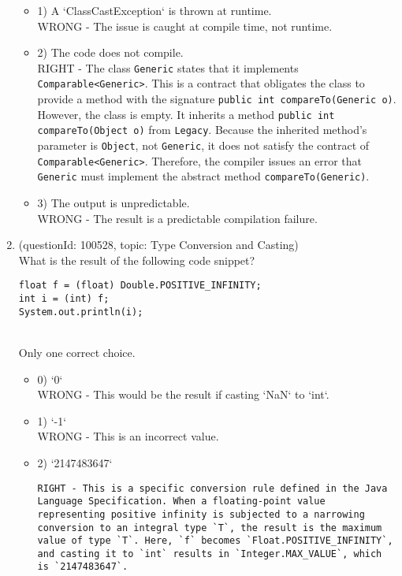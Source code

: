 \documentclass[12pt]{article}
\begin{document}
\begin{enumerate}[label=(\arabic*)]
\begin{itemize}
\item 1) A `ClassCastException` is thrown at runtime.
 \\ 
WRONG - The issue is caught at compile time, not runtime.

\item 2) The code does not compile.
 \\ 
RIGHT - The class \verb|Generic| states that it implements \verb|Comparable<Generic>|. This is a contract that obligates the class to provide a method with the signature \verb|public int compareTo(Generic o)|. However, the class is empty. It inherits a method \verb|public int compareTo(Object o)| from \verb|Legacy|. Because the inherited method's parameter is \verb|Object|, not \verb|Generic|, it does not satisfy the contract of \verb|Comparable<Generic>|. Therefore, the compiler issues an error that \verb|Generic| must implement the abstract method \verb|compareTo(Generic)|.

\item 3) The output is unpredictable.
 \\ 
WRONG - The result is a predictable compilation failure.

\end{itemize}
\item (questionId: 100528, topic: Type Conversion and Casting) \\ 
What is the result of the following code snippet?
\begin{verbatim}
float f = (float) Double.POSITIVE_INFINITY;
int i = (int) f;
System.out.println(i);
\end{verbatim}
\\ \noindent Only one correct choice. 
\begin{itemize}
\item 0) `0`
 \\ 
WRONG - This would be the result if casting `NaN` to `int`.

\item 1) `-1`
 \\ 
WRONG - This is an incorrect value.

\item 2) `2147483647`
 \\ 
\begin{verbatim}RIGHT - This is a specific conversion rule defined in the Java Language Specification. When a floating-point value representing positive infinity is subjected to a narrowing conversion to an integral type `T`, the result is the maximum value of type `T`. Here, `f` becomes `Float.POSITIVE_INFINITY`, and casting it to `int` results in `Integer.MAX_VALUE`, which is `2147483647`.\end{verbatim}


\end{itemize}
\end{enumerate}
\end{document}
